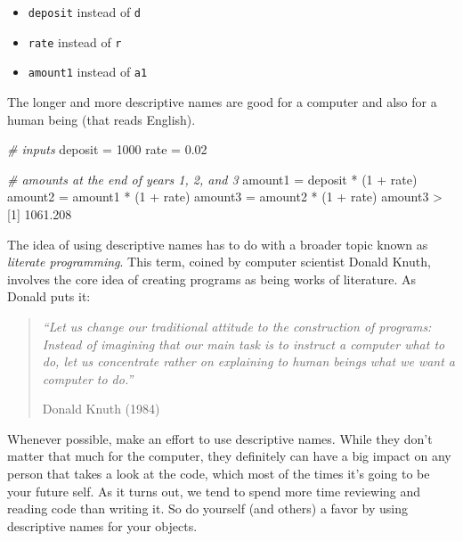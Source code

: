 \documentclass[
]{book}
\newenvironment{Shaded}{\begin{snugshade}}{\end{snugshade}}
\newcommand{\CommentTok}[1]{\textcolor[rgb]{0.56,0.35,0.01}{\textit{#1}}}
\newcommand{\DecValTok}[1]{\textcolor[rgb]{0.00,0.00,0.81}{#1}}
\newcommand{\FloatTok}[1]{\textcolor[rgb]{0.00,0.00,0.81}{#1}}
\newcommand{\NormalTok}[1]{#1}
\newcommand{\OtherTok}[1]{\textcolor[rgb]{0.56,0.35,0.01}{#1}}
\newcommand{\SpecialCharTok}[1]{\textcolor[rgb]{0.00,0.00,0.00}{#1}}
\providecommand{\tightlist}{%
  \setlength{\itemsep}{0pt}\setlength{\parskip}{0pt}}
\begin{document}
\begin{itemize}
\tightlist
\item
  \texttt{deposit} instead of \texttt{d}
\item
  \texttt{rate} instead of \texttt{r}
\item
  \texttt{amount1} instead of \texttt{a1}
\end{itemize}

The longer and more descriptive names are good for a computer and also for a
human being (that reads English).

\begin{Shaded}
\begin{Highlighting}[]
\CommentTok{\# inputs}
\NormalTok{deposit }\OtherTok{=} \DecValTok{1000}
\NormalTok{rate }\OtherTok{=} \FloatTok{0.02}

\CommentTok{\# amounts at the end of years 1, 2, and 3}
\NormalTok{amount1 }\OtherTok{=}\NormalTok{ deposit }\SpecialCharTok{*}\NormalTok{ (}\DecValTok{1} \SpecialCharTok{+}\NormalTok{ rate)}
\NormalTok{amount2 }\OtherTok{=}\NormalTok{ amount1 }\SpecialCharTok{*}\NormalTok{ (}\DecValTok{1} \SpecialCharTok{+}\NormalTok{ rate)}
\NormalTok{amount3 }\OtherTok{=}\NormalTok{ amount2 }\SpecialCharTok{*}\NormalTok{ (}\DecValTok{1} \SpecialCharTok{+}\NormalTok{ rate)}
\NormalTok{amount3}
\SpecialCharTok{\textgreater{}}\NormalTok{ [}\DecValTok{1}\NormalTok{] }\FloatTok{1061.208}
\end{Highlighting}
\end{Shaded}

The idea of using descriptive names has to do with a broader topic known as
\emph{literate programming}. This term, coined by computer scientist Donald Knuth,
involves the core idea of creating programs as being works of literature. As
Donald puts it:

\begin{quote}
\emph{``Let us change our traditional attitude to the construction of programs: Instead of imagining that our main task is to instruct a computer what to do, let us concentrate rather on explaining to human beings what we want a computer to do.''}

Donald Knuth (1984)
\end{quote}

Whenever possible, make an effort to use descriptive names. While they don't
matter that much for the computer, they definitely can have a big impact on
any person that takes a look at the code, which most of the times it's going to
be your future self. As it turns out, we tend to spend more time reviewing and
reading code than writing it. So do yourself (and others) a favor by using
descriptive names for your objects.
\end{document}
